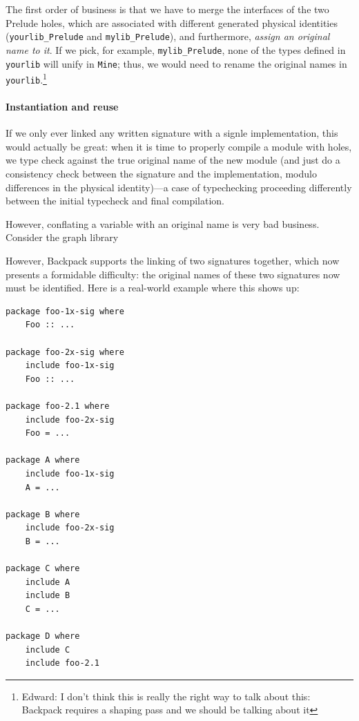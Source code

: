 \documentclass{article}
\begin{document}
The first order of business is that we have to merge the interfaces of
the two Prelude holes, which are associated with different generated
physical identities (\verb|yourlib_Prelude| and \verb|mylib_Prelude|),
and furthermore, \emph{assign an original name to it}.  If we pick,
for example, \verb|mylib_Prelude|, none of the types defined in \verb|yourlib|
will unify in \verb|Mine|; thus, we would need to rename the original names
in \verb|yourlib|.\footnote{Edward: I don't think this is really the
right way to talk about this: Backpack requires a shaping pass and we should
be talking about it}

\iffalse%


\paragraph{Instantiation and reuse}

If we only ever linked any written signature with a signle implementation, this would actually
be great: when it is time to properly compile a module with holes, we
type check against the true original name of the new module (and just
do a consistency check between the signature and the implementation, modulo
differences in the physical identity)---a case of typechecking proceeding
differently between the initial typecheck and final compilation.

However, conflating a variable with an original name is very bad business.
Consider the graph library 

However, Backpack supports the linking of two signatures together, which
now presents a formidable difficulty: the original names of these two
signatures now must be identified.  Here is a real-world example where
this shows up:

\begin{verbatim}
package foo-1x-sig where
    Foo :: ...

package foo-2x-sig where
    include foo-1x-sig
    Foo :: ...

package foo-2.1 where
    include foo-2x-sig
    Foo = ...

package A where
    include foo-1x-sig
    A = ...

package B where
    include foo-2x-sig
    B = ...

package C where
    include A
    include B
    C = ...

package D where
    include C
    include foo-2.1
\end{verbatim}
\end{document}
